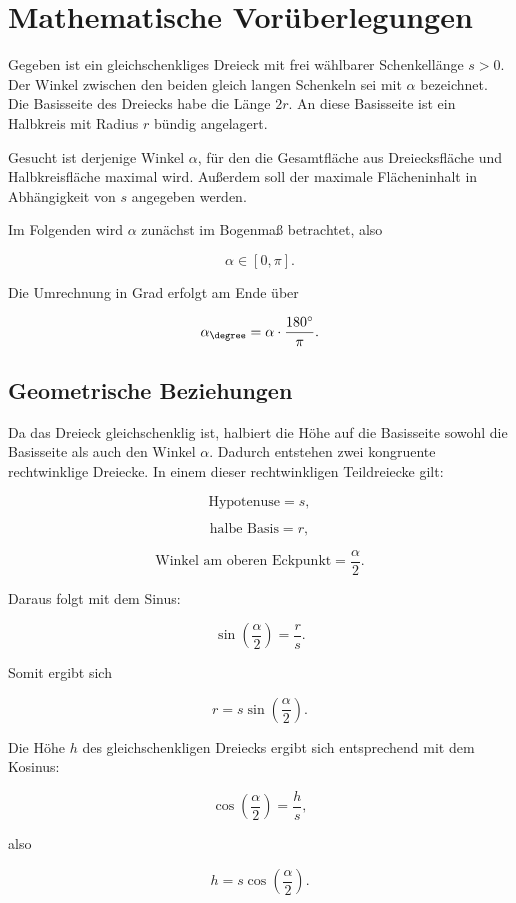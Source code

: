 \section{Mathematische Vorüberlegungen}

Gegeben ist ein gleichschenkliges Dreieck mit frei wählbarer
Schenkellänge \(s>0\). Der Winkel zwischen den beiden gleich langen
Schenkeln sei mit \(\alpha\) bezeichnet. Die Basisseite des Dreiecks habe
die Länge \(2r\). An diese Basisseite ist ein Halbkreis mit Radius \(r\)
bündig angelagert.

Gesucht ist derjenige Winkel \(\alpha\), für den die Gesamtfläche aus
Dreiecksfläche und Halbkreisfläche maximal wird. Außerdem soll der
maximale Flächeninhalt in Abhängigkeit von \(s\) angegeben werden.

Im Folgenden wird \(\alpha\) zunächst im Bogenmaß betrachtet, also

\[
\alpha \in [0,\pi].
\]

Die Umrechnung in Grad erfolgt am Ende über

\[
\alpha_{\degree}
=
\alpha \cdot \frac{180^\circ}{\pi}.
\]

\subsection{Geometrische Beziehungen}

Da das Dreieck gleichschenklig ist, halbiert die Höhe auf die Basisseite
sowohl die Basisseite als auch den Winkel \(\alpha\). Dadurch entstehen
zwei kongruente rechtwinklige Dreiecke. In einem dieser rechtwinkligen
Teildreiecke gilt:

\[
\text{Hypotenuse} = s,
\]

\[
\text{halbe Basis} = r,
\]

\[
\text{Winkel am oberen Eckpunkt} = \frac{\alpha}{2}.
\]

Daraus folgt mit dem Sinus:

\[
\sin\left(\frac{\alpha}{2}\right)
=
\frac{r}{s}.
\]

Somit ergibt sich

\[
r
=
s\sin\left(\frac{\alpha}{2}\right).
\]

Die Höhe \(h\) des gleichschenkligen Dreiecks ergibt sich entsprechend mit
dem Kosinus:

\[
\cos\left(\frac{\alpha}{2}\right)
=
\frac{h}{s},
\]

also

\[
h
=
s\cos\left(\frac{\alpha}{2}\right).
\]

